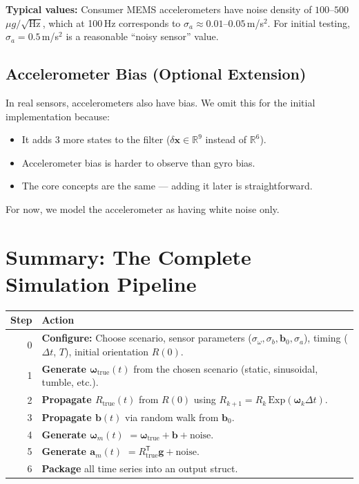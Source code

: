 \documentclass[11pt,letterpaper]{article}
\newcommand{\R}{\mathbb{R}}
\newcommand{\expmap}{\mathrm{Exp}}
\begin{document}
\textbf{Typical values:}  Consumer MEMS accelerometers have noise
density of $100$--$500$\,$\mu g/\sqrt{\text{Hz}}$, which at
100\,Hz corresponds to
$\sigma_a \approx 0.01$--$0.05$\,m/s$^{2}$.  For initial testing,
$\sigma_a = 0.5$\,m/s$^{2}$ is a reasonable ``noisy sensor''
value.

\subsection{Accelerometer Bias (Optional Extension)}

In real sensors, accelerometers also have bias.  We omit this for
the initial implementation because:
\begin{itemize}[nosep]
  \item It adds 3 more states to the filter
    ($\delta\mathbf{x} \in \R^{9}$ instead of $\R^{6}$).
  \item Accelerometer bias is harder to observe than gyro bias.
  \item The core concepts are the same --- adding it later is
    straightforward.
\end{itemize}

For now, we model the accelerometer as having white noise only.

\section{Summary: The Complete Simulation Pipeline}

\begin{center}
\begin{tabular}{rp{10cm}}
\toprule
\textbf{Step} & \textbf{Action} \\
\midrule
0 & \textbf{Configure:} Choose scenario, sensor parameters
    ($\sigma_{\omega}, \sigma_b, \mathbf{b}_0, \sigma_a$),
    timing ($\Delta t$, $T$), initial orientation $R(0)$. \\[4pt]
1 & \textbf{Generate $\bm{\omega}_{\mathrm{true}}(t)$} from the
    chosen scenario (static, sinusoidal, tumble, etc.). \\[4pt]
2 & \textbf{Propagate $R_{\mathrm{true}}(t)$} from $R(0)$ using
    $R_{k+1} = R_k \, \expmap(\bm{\omega}_k \Delta t)$. \\[4pt]
3 & \textbf{Propagate $\mathbf{b}(t)$} via random walk from
    $\mathbf{b}_0$. \\[4pt]
4 & \textbf{Generate $\bm{\omega}_m(t)$} $= \bm{\omega}_{\mathrm{true}}
    + \mathbf{b} + \text{noise}$. \\[4pt]
5 & \textbf{Generate $\mathbf{a}_m(t)$} $= R_{\mathrm{true}}^{\mathsf{T}}
    \mathbf{g} + \text{noise}$. \\[4pt]
6 & \textbf{Package} all time series into an output struct. \\
\bottomrule
\end{tabular}
\end{center}
\end{document}
